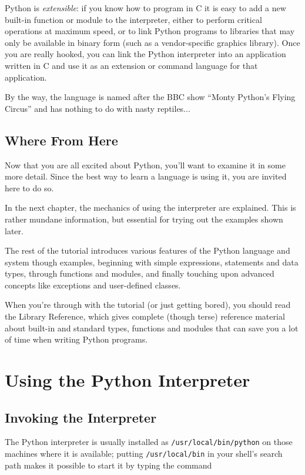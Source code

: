 Python is {\em extensible}: if you know how to program in C it is easy
to add a new built-in
function or
module to the interpreter, either to
perform critical operations at maximum speed, or to link Python
programs to libraries that may only be available in binary form (such
as a vendor-specific graphics library).  Once you are really hooked,
you can link the Python interpreter into an application written in C
and use it as an extension or command language for that application.

By the way, the language is named after the BBC show ``Monty
Python's Flying Circus'' and has nothing to do with nasty reptiles...

\section{Where From Here}

Now that you are all excited about Python, you'll want to examine it
in some more detail.  Since the best way to learn a language is
using it, you are invited here to do so.

In the next chapter, the mechanics of using the interpreter are
explained.  This is rather mundane information, but essential for
trying out the examples shown later.

The rest of the tutorial introduces various features of the Python
language and system though examples, beginning with simple
expressions, statements and data types, through functions and modules,
and finally touching upon advanced concepts like exceptions
and user-defined classes.

When you're through with the tutorial (or just getting bored), you
should read the Library Reference, which gives complete (though terse)
reference material about built-in and standard types, functions and
modules that can save you a lot of time when writing Python programs.


\chapter{Using the Python Interpreter}

\section{Invoking the Interpreter}

The Python interpreter is usually installed as {\tt /usr/local/bin/python}
on those machines where it is available; putting {\tt /usr/local/bin} in
your {\UNIX} shell's search path makes it possible to start it by
typing the command

